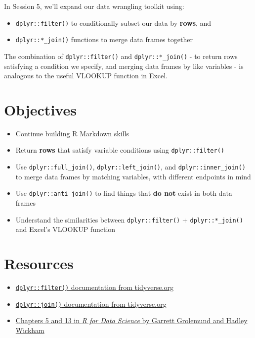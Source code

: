 \documentclass[]{book}
\providecommand{\tightlist}{%
  \setlength{\itemsep}{0pt}\setlength{\parskip}{0pt}}
\begin{document}
In Session 5, we'll expand our data wrangling toolkit using:

\begin{itemize}
\tightlist
\item
  \texttt{dplyr::filter()} to conditionally subset our data by \textbf{rows}, and
\item
  \texttt{dplyr::*\_join()} functions to merge data frames together
\end{itemize}

The combination of \texttt{dplyr::filter()} and \texttt{dplyr::*\_join()} - to return rows satisfying a condition we specify, and merging data frames by like variables - is analogous to the useful VLOOKUP function in Excel.

\hypertarget{objectives-4}{%
\section{Objectives}\label{objectives-4}}

\begin{itemize}
\tightlist
\item
  Continue building R Markdown skills
\item
  Return \textbf{rows} that satisfy variable conditions using \texttt{dplyr::filter()}
\item
  Use \texttt{dplyr::full\_join()}, \texttt{dplyr::left\_join()}, and \texttt{dplyr::inner\_join()} to merge data frames by matching variables, with different endpoints in mind
\item
  Use \texttt{dplyr::anti\_join()} to find things that \textbf{do not} exist in both data frames
\item
  Understand the similarities between \texttt{dplyr::filter()} + \texttt{dplyr::*\_join()} and Excel's VLOOKUP function
\end{itemize}

\hypertarget{resources-7}{%
\section{Resources}\label{resources-7}}

\begin{itemize}
\tightlist
\item
  \href{https://dplyr.tidyverse.org/reference/filter.html}{\texttt{dplyr::filter()} documentation from tidyverse.org}
\item
  \href{https://dplyr.tidyverse.org/reference/join.html}{\texttt{dplyr::join()} documentation from tidyverse.org}
\item
  \href{https://r4ds.had.co.nz/}{Chapters 5 and 13 in \emph{R for Data Science} by Garrett Grolemund and Hadley Wickham}
\end{itemize}
\end{document}
